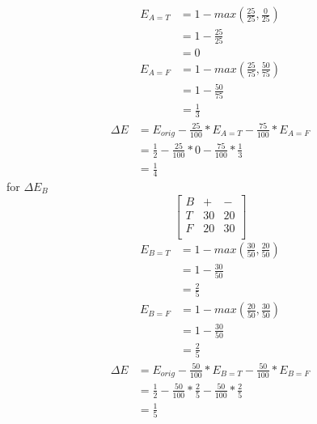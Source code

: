 \documentclass[12pt,english]{article}
\begin{document}
\begin{equation*}\tag{3}\label{eq:30}
\begin{split}
E_{A=T} &= 1 - max(\frac{25}{25},\frac{0}{25})\\
&=1 - \frac{25}{25}\\
&=0
\end{split}
\end{equation*}
\begin{equation*}\tag{4}\label{eq:31}
\begin{split}
E_{A=F} &= 1 - max(\frac{25}{75},\frac{50}{75})\\
&=1 - \frac{50}{75}\\
&=\frac{1}{3}
\end{split}
\end{equation*}
\begin{equation*}\tag{5}\label{eq:32}
\begin{split}
\Delta E &= E_{orig} - \frac{25}{100} * E_{A=T} - \frac{75}{100} * E_{A=F}\\
&= \frac{1}{2} -\frac{25}{100} *0 - \frac{75}{100} *\frac{1}{3}\\
&= \frac{1}{4}
\end{split}
\end{equation*}
for $\Delta E_{B}$\\
\begin{equation*}\tag{6}\label{eq:33}
\begin{bmatrix} B & + & - \\T & 30 &  20 \\F & 20 & 30 \\ \end{bmatrix}
\end{equation*}
\begin{equation*}\tag{7}\label{eq:34}
\begin{split}
E_{B=T} &= 1 - max(\frac{30}{50},\frac{20}{50})\\
&=1 - \frac{30}{50}\\
&=\frac{2}{5}
\end{split}
\end{equation*}
\begin{equation*}\tag{8}\label{eq:35}
\begin{split}
E_{B=F} &= 1 - max(\frac{20}{50},\frac{30}{50})\\
&=1 - \frac{30}{50}\\
&=\frac{2}{5}
\end{split}
\end{equation*}
\begin{equation*}\tag{9}\label{eq:36}
\begin{split}
\Delta E &= E_{orig} - \frac{50}{100} * E_{B=T} - \frac{50}{100} * E_{B=F}\\
&= \frac{1}{2} -\frac{50}{100} *\frac{2}{5} - \frac{50}{100} *\frac{2}{5}\\
&= \frac{1}{5}
\end{split}
\end{equation*}
\end{document}

